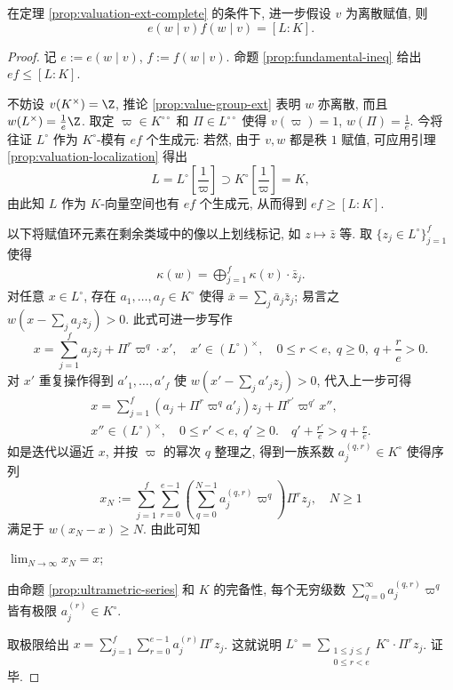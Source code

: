\begin{theorem}\label{prop:fundamental-eq-complete}
	在定理 \ref{prop:valuation-ext-complete} 的条件下, 进一步假设 $v$ 为离散赋值, 则
	\[ e(w \mid v) f(w \mid v) = [L:K]. \]
\end{theorem}
\begin{proof}
	记 $e := e(w \mid v)$, $f := f(w \mid v)$. 命题 \ref{prop:fundamental-ineq} 给出 $ef \leq [L:K]$.

	不妨设 $v(K^\times)=\Z$, 推论 \ref{prop:value-group-ext} 表明 $w$ 亦离散, 而且 $w(L^\times) = \frac{1}{e}\Z$. 取定 $\varpi \in K^{\circ\circ}$ 和 $\Pi \in L^{\circ\circ}$ 使得 $v(\varpi) = 1$, $w(\Pi) = \frac{1}{e}$. 今将往证 $L^\circ$ 作为 $K^\circ$-模有 $ef$ 个生成元: 若然, 由于 $v,w$ 都是秩 $1$ 赋值, 可应用引理 \ref{prop:valuation-localization} 得出
	\[ L = L^\circ\left[ \frac{1}{\varpi} \right] \supset K^\circ\left[ \frac{1}{\varpi} \right] = K, \]
	由此知 $L$ 作为 $K$-向量空间也有 $ef$ 个生成元, 从而得到 $ef \geq [L:K]$.

	以下将赋值环元素在剩余类域中的像以上划线标记, 如 $z \mapsto \bar{z}$ 等. 取 $\{z_j \in L^\circ \}_{j=1}^f$ 使得
	\begin{gather*}
		\kappa(w) = \bigoplus_{j=1}^f \kappa(v) \cdot \bar{z}_j.
	\end{gather*}
	对任意 $x \in L^\circ$, 存在 $a_1, \ldots, a_f \in K^\circ$ 使得 $\bar{x} = \sum_j \bar{a}_j \bar{z}_j$; 易言之 $w(x - \sum_j a_j z_j) > 0$. 此式可进一步写作
	\[ x = \sum_{j=1}^f a_j z_j + \Pi^r \varpi^q \cdot x', \quad x' \in (L^\circ)^\times, \quad 0 \leq r < e, \; q \geq 0, \; q + \frac{r}{e} > 0. \]
	对 $x'$ 重复操作得到 $a'_1, \ldots, a'_f$ 使 $w(x' - \sum_j a'_j z_j) > 0$, 代入上一步可得
	\begin{gather*}
		x = \sum_{j=1}^f \left( a_j + \Pi^r \varpi^q a'_j \right) z_j + \Pi^{r'} \varpi^{q'}x'', \\
		x'' \in (L^\circ)^\times, \quad 0 \leq r' < e, \; q' \geq 0. \quad q'+ \frac{r'}{e} > q + \frac{r}{e}.
	\end{gather*}
	如是迭代以逼近 $x$, 并按 $\varpi$ 的幂次 $q$ 整理之, 得到一族系数 $a_j^{(q,r)} \in K^\circ$ 使得序列
	\[ x_N := \sum_{j=1}^f \sum_{r=0}^{e-1} \left(\sum_{q=0}^{N-1} a_j^{(q,r)} \varpi^q \right) \Pi^r z_j, \quad N \geq 1 \]
	满足于 $w(x_N - x) \geq N$. 由此可知
	\begin{compactitem}
		\item $\lim_{N \to \infty} x_N = x$;
		\item 由命题 \ref{prop:ultrametric-series} 和 $K$ 的完备性, 每个无穷级数 $\sum_{q=0}^\infty a_j^{(q,r)} \varpi^q$ 皆有极限 $a_j^{(r)} \in K^\circ$.
	\end{compactitem}
	取极限给出 $x = \sum_{j=1}^f \sum_{r=0}^{e-1} a_j^{(r)} \Pi^r z_j$. 这就说明 $L^\circ = \displaystyle\sum_{\substack{1 \leq j \leq f \\ 0 \leq r < e}} K^\circ \cdot \Pi^r z_j$. 证毕.
\end{proof}

